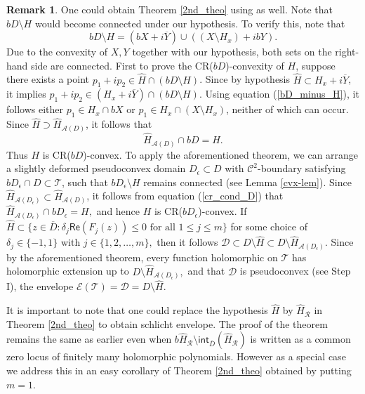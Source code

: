 \documentclass[12pt,reqno, a4paper]{amsart}
\theoremstyle{definition}
\newtheorem{remark}[theorem]{Remark}
\theoremstyle{definition}
\numberwithin{equation}{section}
\def\eps{\epsilon}
\begin{document}
\begin{remark}
	One could obtain Theorem \ref{2nd_theo} using \cite[Theorem 1]{por-thie} as well. Note that $bD\setminus H$ would become connected under our hypothesis. To verify this, note that 
	\begin{equation}\label{bD_minus_H}
		bD\setminus H=(bX+i\overline{Y})\cup ((X\setminus H_x)+ibY).
	\end{equation}
Due to the convexity of $X,Y$ together with our hypothesis, both sets on the right-hand side are connected. First to prove the CR($bD$)-convexity of $H$, suppose there exists a point $p_1+ip_2\in \widehat{H}\cap (bD\setminus H)$.  Since by hypothesis $\widehat{H}\subset H_x+i\overline{Y}$, it implies $p_1+ip_2\in (H_x+i\overline{Y})\cap (bD\setminus H).$ Using equation (\ref{bD_minus_H}), it follows either $p_1\in H_x\cap bX$ or $p_1\in H_x\cap (X\setminus H_x)$, neither of which can occur. Since $\widehat{H} \supset \widehat{H}_{\mathcal{A}(D)}$, it follows that 
\begin{equation}\label{cr_cond_D}
\widehat{H}_{\mathcal{A}(D)} \cap bD =H.
\end{equation}
Thus $H$ is CR($bD$)-convex. To apply the aforementioned theorem, we can arrange a slightly deformed pseudoconvex domain $D_{\eps}\subset D$ with $\mathcal{C}^2$-boundary  satisfying $bD_{\eps}\cap D \subset \mathcal{T}$, such that $bD_{\eps}\setminus H$ remains connected (see Lemma \ref{cvx-lem}). Since $\widehat{H}_{\mathcal{A}(D_{\eps})}\subset \widehat{H}_{\mathcal{A}(D)}$, it follows from equation (\ref{cr_cond_D}) that $\widehat{H}_{\mathcal{A}(D_{\eps})} \cap bD_{\eps} =H,$ and hence  $H$ is CR($bD_{\eps}$)-convex. If  ${\widehat{H} \subset \{z\in \overline{D}: \delta_j\textsf{Re}(F_j(z))\leq0 \text{ for all }1\leq j\leq m\}}$ for some choice of $\delta_j\in\{ -1,1\}$ with $j\in \{1,2,\ldots, m\},$ then it follows $\mathcal{D}\subset D\setminus\widehat{H}\subset D\setminus \widehat{H}_{\mathcal{A}(D_{\eps})}.$ Since by the aforementioned theorem, every function holomorphic on $\mathcal{T}$ has holomorphic extension up to $D\setminus \widehat{H}_{\mathcal{A}(D_{\eps})},$ and that $\mathcal{D}$ is pseudoconvex (see Step I), the envelope $\mathcal{E}({\mathcal{T}})=\mathcal{D}=D\setminus \widehat{H}$.
\end{remark}
It is important to note that one could replace the hypothesis $\widehat{H}$ by $\widehat{H}_{\mathcal{R}}$ in Theorem \ref{2nd_theo} to obtain schlicht envelope. The proof of the theorem remains the same as earlier even when $b\widehat{H}_{\mathcal{R}} \setminus\textsf{int}_{\overline{D}}(\widehat{H}_{\mathcal{R}})$ is written as a common zero locus of finitely many holomorphic polynomials. However as a special case we address this in an easy corollary of Theorem \ref{2nd_theo} obtained by putting $m=1$.
\end{document}
